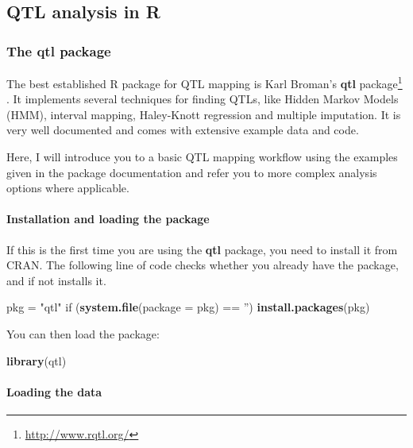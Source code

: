 \documentclass[12pt,]{krantz}
\newenvironment{Shaded}{\begin{snugshade}}{\end{snugshade}}
\newcommand{\KeywordTok}[1]{\textcolor[rgb]{0.27,0.27,0.27}{\textbf{{#1}}}}
\newcommand{\DataTypeTok}[1]{\textcolor[rgb]{0.27,0.27,0.27}{{#1}}}
\newcommand{\StringTok}[1]{\textcolor[rgb]{0.5,0.5,0.5}{{#1}}}
\newcommand{\NormalTok}[1]{{#1}}
\let\oldparagraph\paragraph
\renewcommand{\paragraph}[1]{\oldparagraph{#1}\mbox{}}
\renewcommand{\href}[2]{#2\footnote{\url{#1}}}
\begin{document}
\subsection{QTL analysis in R}\label{qtl-analysis-in-r}

\subsubsection{The qtl package}\label{the-qtl-package}

The best established R package for QTL mapping is Karl Broman's
\href{http://www.rqtl.org/}{\textbf{qtl} package} \citep{R-qtl}. It
implements several techniques for finding QTLs, like Hidden Markov
Models (HMM), interval mapping, Haley-Knott regression and multiple
imputation. It is very well documented and comes with extensive example
data and code.

Here, I will introduce you to a basic QTL mapping workflow using the
examples given in the package documentation and refer you to more
complex analysis options where applicable.

\paragraph{Installation and loading the
package}\label{installation-and-loading-the-package}

If this is the first time you are using the \textbf{qtl} package, you
need to install it from CRAN. The following line of code checks whether
you already have the package, and if not installs it.

\begin{Shaded}
\begin{Highlighting}[]
\NormalTok{pkg =}\StringTok{ "qtl"}
\NormalTok{if (}\KeywordTok{system.file}\NormalTok{(}\DataTypeTok{package =} \NormalTok{pkg) ==}\StringTok{ ''}\NormalTok{) }\KeywordTok{install.packages}\NormalTok{(pkg)}
\end{Highlighting}
\end{Shaded}

You can then load the package:

\begin{Shaded}
\begin{Highlighting}[]
\KeywordTok{library}\NormalTok{(qtl)}
\end{Highlighting}
\end{Shaded}

\paragraph{Loading the data}\label{loading-the-data}
\end{document}
